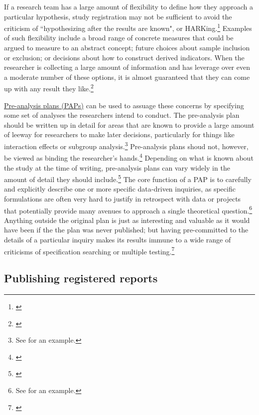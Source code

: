 \documentclass[]{tufte-book}
\begin{document}
If a research team has a large amount of flexibility to define how they
approach a particular hypothesis, study registration may not be
sufficient to avoid the criticism of ``hypothesizing after the results
are known", or HARKing.\footnote{\cite{@kerr1998harking}} Examples of
such flexibility include a broad range of concrete measures that could
be argued to measure to an abstract concept; future choices about sample
inclusion or exclusion; or decisions about how to construct derived
indicators. When the researcher is collecting a large amount of
information and has leverage over even a moderate number of these
options, it is almost guaranteed that they can come up with any result
they like.\footnote{\cite{@gelman2013garden}}

\href{https://dimewiki.worldbank.org/Pre-Analysis_Plan}{Pre-analysis
plans (PAPs)} can be used to assuage these
concerns by specifying some set of analyses the researchers intend to
conduct. The pre-analysis plan should be written up in detail for areas
that are known to provide a large amount of leeway for researchers to
make later decisions, particularly for things like interaction effects
or subgroup analysis.\footnote{See \cite{@cusolito2018can} for an
  example.} Pre-analysis plans shoud not, however, be viewed as binding
the researcher's hands.\footnote{\cite{@olken2015promises}} Depending on
what is known about the study at the time of writing, pre-analysis plans
can vary widely in the amount of detail they should include.\footnote{\href{https://blogs.worldbank.org/impactevaluations/pre-analysis-plans-and-registered-reports-what-new-opinion-piece-does-and-doesnt}{}}
The core function of a PAP is to carefully and explicitly describe one
or more specific data-driven inquiries, as specific formulations are
often very hard to justify in retrospect with data or projects that
potentially provide many avenues to approach a single theoretical
question.\footnote{See \cite{@bedoya2019no} for an example.} Anything
outside the original plan is just as interesting and valuable as it
would have been if the the plan was never published; but having
pre-committed to the details of a particular inquiry makes its results
immune to a wide range of criticisms of specification searching or
multiple testing.\footnote{\cite{@duflo2020praise}}

\hypertarget{publishing-registered-reports}{%
\subsection*{Publishing registered
reports}\label{publishing-registered-reports}}
\end{document}
